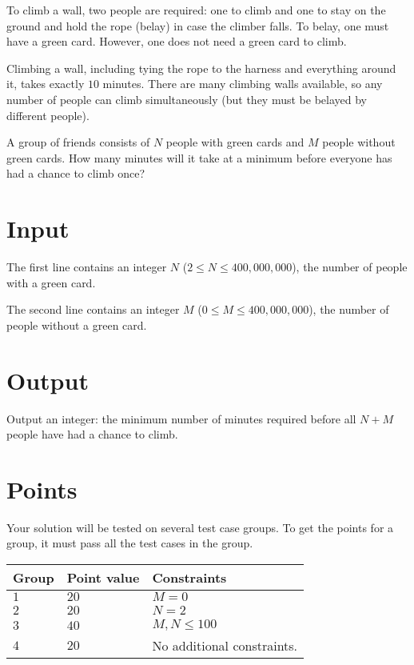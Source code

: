 \noindent
To climb a wall, two people are required: one to climb and one to stay on the ground and hold the rope (belay) in case the climber falls. To belay, one must have a green card. However, one does not need a green card to climb.

Climbing a wall, including tying the rope to the harness and everything around it, takes exactly $10$ minutes. There are many climbing walls available, so any number of people can climb simultaneously (but they must be belayed by different people).

A group of friends consists of $N$ people with green cards and $M$ people without green cards. How many minutes will it take at a minimum before everyone has had a chance to climb once?


\section*{Input}
The first line contains an integer $N$ ($2 \le N \le 400,000,000$), the number of people with a green card.

The second line contains an integer $M$ ($0 \le M \le 400,000,000$), the number of people without a green card.

\section*{Output}
Output an integer: the minimum number of minutes required before all $N + M$ people have had a chance to climb.

\section*{Points}
Your solution will be tested on several test case groups.
To get the points for a group, it must pass all the test cases in the group.

\noindent
\begin{tabular}{| l | l | p{12cm} |}
  \hline
  \textbf{Group} & \textbf{Point value} & \textbf{Constraints} \\ \hline
  $1$   & $20$        & $M = 0$ \\ \hline
  $2$   & $20$        & $N = 2$ \\ \hline
  $3$   & $40$        & $M, N \le 100$ \\ \hline
  $4$    & $20$        & No additional constraints. \\ \hline
\end{tabular}

